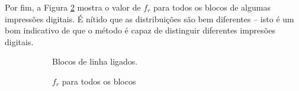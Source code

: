 \documentclass[10pt,a4paper]{article}
\begin{document}
Por fim, a Figura \ref{fig:fingerprint_all} mostra o valor de $f_r$ para todos os blocos de algumas impressões digitais. É nítido que as distribuições são bem diferentes -- isto é um bom indicativo de que o método é capaz de distinguir diferentes impresões digitais.
\begin{figure}[!htb]
    \begin{subfigure}[ht]{0.45\textwidth}
    \centering
        \caption{Blocos de linha ligados.}
        \label{fig:fingerprint}
    \end{subfigure}
    \qquad
    \begin{subfigure}[ht]{0.45\textwidth}
        \caption{$f_r$ para todos os blocos}
        \label{fig:fingerprint_all}
    \end{subfigure}
    \\
    \begin{subfigure}[ht]{0.45\textwidth}
    \centering

\end{subfigure}
\end{figure}
\end{document}
